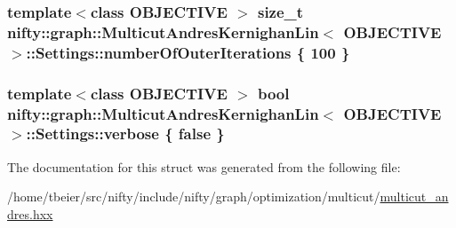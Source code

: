 \subsubsection[{number\+Of\+Outer\+Iterations}]{\setlength{\rightskip}{0pt plus 5cm}template$<$class O\+B\+J\+E\+C\+T\+I\+V\+E $>$ size\+\_\+t {\bf nifty\+::graph\+::\+Multicut\+Andres\+Kernighan\+Lin}$<$ O\+B\+J\+E\+C\+T\+I\+V\+E $>$\+::Settings\+::number\+Of\+Outer\+Iterations \{ 100 \}}\label{structnifty_1_1graph_1_1MulticutAndresKernighanLin_1_1Settings_abdb148ebe4241c5e825c793e175c5666}
\hypertarget{structnifty_1_1graph_1_1MulticutAndresKernighanLin_1_1Settings_a73c18aae79e4a0c5eb5038b0675888f0}{}
\subsubsection[{verbose}]{\setlength{\rightskip}{0pt plus 5cm}template$<$class O\+B\+J\+E\+C\+T\+I\+V\+E $>$ bool {\bf nifty\+::graph\+::\+Multicut\+Andres\+Kernighan\+Lin}$<$ O\+B\+J\+E\+C\+T\+I\+V\+E $>$\+::Settings\+::verbose \{ false \}}\label{structnifty_1_1graph_1_1MulticutAndresKernighanLin_1_1Settings_a73c18aae79e4a0c5eb5038b0675888f0}


The documentation for this struct was generated from the following file\+:\begin{DoxyCompactItemize}
\item 
/home/tbeier/src/nifty/include/nifty/graph/optimization/multicut/\hyperlink{multicut__andres_8hxx}{multicut\+\_\+andres.\+hxx}\end{DoxyCompactItemize}
